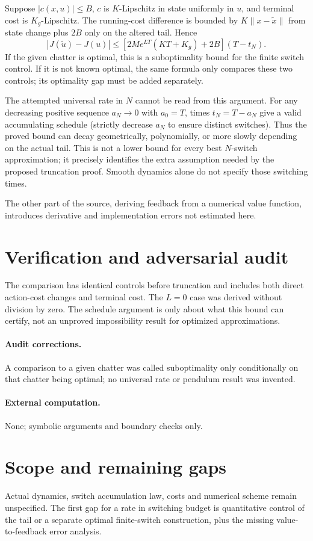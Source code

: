 \documentclass[11pt]{article}
\begin{document}
Suppose $|c(x,u)|\le B$, $c$ is $K$-Lipschitz in state uniformly in $u$,
and terminal cost is $K_g$-Lipschitz. The running-cost difference is bounded
by $K\|x-\widetilde x\|$ from state change plus $2B$ only on the altered
tail. Hence
\[
 |J(\widetilde u)-J(u)|
 \le[2M e^{LT}(KT+K_g)+2B](T-t_N).
\]
If the given chatter is optimal, this is a suboptimality bound for the finite
switch control. If it is not known optimal, the same formula only compares
these two controls; its optimality gap must be added separately.

The attempted universal rate in $N$ cannot be read from this argument.
For any decreasing positive sequence $a_N\to0$ with $a_0=T$, times
$t_N=T-a_N$ give a valid accumulating schedule (strictly decrease $a_N$ to
ensure distinct switches). Thus the proved bound can decay geometrically,
polynomially, or more slowly depending on the actual tail. This is not a
lower bound for every best $N$-switch approximation; it precisely identifies
the extra assumption needed by the proposed truncation proof. Smooth dynamics
alone do not specify those switching times.

The other part of the source, deriving feedback from a numerical value
function, introduces derivative and implementation errors not estimated here.
\section{Verification and adversarial audit}
The comparison has identical controls before truncation and includes
both direct action-cost changes and terminal cost. The $L=0$ case was derived
without division by zero. The schedule argument is only about what this bound
can certify, not an unproved impossibility result for optimized approximations.
\paragraph{Audit corrections.} A comparison to a given chatter was called suboptimality only conditionally on that chatter being optimal; no universal rate or pendulum result was invented.
\paragraph{External computation.} None; symbolic arguments and boundary checks only.
\section{Scope and remaining gaps}
Actual dynamics, switch accumulation law, costs and numerical scheme remain
unspecified. The first gap for a rate in switching budget is quantitative
control of the tail or a separate optimal finite-switch construction, plus
the missing value-to-feedback error analysis.
\end{document}
